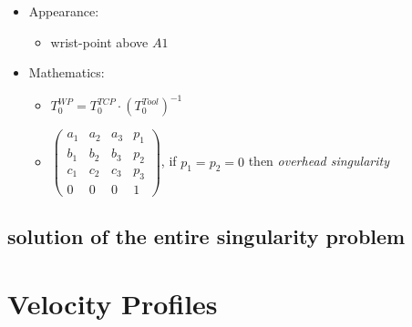 \documentclass[%
  professionalfonts,%
  xcolor={%
    usenames,%
    dvipsnames,%
    svgnames,%
    table,%
    hyperref%
  }%
]{beamer}
\begin{document}
\begin{frame}
\begin{itemize}
\item Appearance:
  \begin{itemize}
  \item wrist-point above $A1$
  \end{itemize}
\item Mathematics:
  \begin{itemize}
  \item $T_{0}^{WP} = T_{0}^{TCP} \cdot (T_{0}^{Tool})^{-1}$
  \item           
  $\begin{pmatrix}
  a_1 & a_2 & a_3 & p_1 \\
  b_1 & b_2 & b_3 & p_2 \\
  c_1 & c_2 & c_3 & p_3 \\
  0   & 0   & 0   & 1 
  \end{pmatrix}$, 
  if $p_1 = p_2 = 0$ then \emph{overhead singularity}
  \end{itemize}
\end{itemize}  
\end{frame}

\begin{frame}[fragile]

\end{frame}

\subsection{solution of the entire singularity problem}
\begin{frame}[fragile]
\scalebox{0.7}{

}
\end{frame}


\section{Velocity Profiles}
\end{document}
